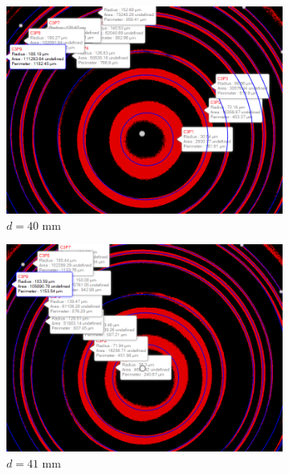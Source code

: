 \begin{figure}
    \centering
    \begin{subfigure}[b]{0.45\textwidth}
        \centering
        \includegraphics[width=\textwidth]{images/40.png}
        \caption{$d=40$ mm}
    \end{subfigure}
    \hfill
    \begin{subfigure}[b]{0.45\textwidth}
        \centering
        \includegraphics[width=\textwidth]{images/41.png}
        \caption{$d=41$ mm}
    \end{subfigure}
    \hfill
    \begin{subfigure}[b]{0.45\textwidth}
        \centering

\end{subfigure}
\end{figure}
